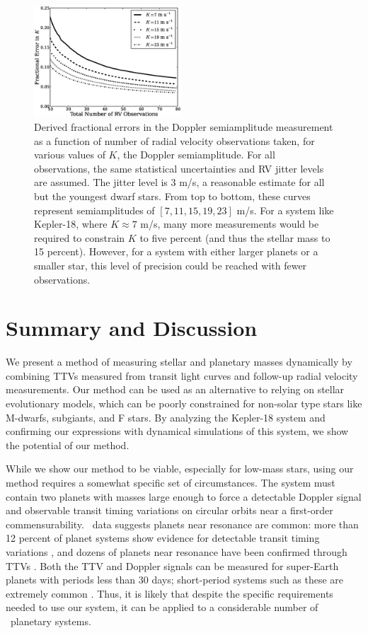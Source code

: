 \begin{figure}[htbp]
\centerline{\includegraphics[width=0.49\textwidth]{f1.eps}}
\caption{ Derived fractional errors in the Doppler semiamplitude measurement as a function of number of radial velocity observations taken, for various values of $K$, the Doppler semiamplitude. For all observations, the same statistical uncertainties and RV jitter levels are assumed. The jitter level is 3 m/s, a reasonable estimate for all but the youngest dwarf stars. From top to bottom, these curves represent semiamplitudes of $[7, 11, 15, 19, 23]$ m/s. For a system like Kepler-18, where $K \approx 7$ m/s, many more measurements would be required to constrain $K$ to five percent (and thus the stellar mass to 15 percent). However, for a system with either larger planets or a smaller star, this level of precision could be reached with fewer observations.
  }

\label{RVerrors}
\end{figure}



\section{Summary and Discussion}

\label{S:SD}

We present a  method of measuring stellar and planetary masses dynamically by combining TTVs measured from transit light curves and follow-up radial velocity measurements. Our method can be used as an alternative to relying on stellar evolutionary models, which can be poorly constrained for non-solar type stars like M-dwarfs, subgiants, and F stars. By analyzing the Kepler-18 system and confirming our expressions with dynamical simulations of this system, we show the potential of our method.

While we show our method to be viable, especially for low-mass stars, using our method requires a somewhat specific set of circumstances. The system must contain two planets with masses large enough to force a detectable Doppler signal and observable transit timing variations on circular orbits near a first-order commensurability. \kep\ data suggests planets near resonance are common: more than 12 percent of planet systems show evidence for detectable transit timing variations \citep{Ford12a}, and dozens of planets near resonance have been confirmed through TTVs \citep{Steffen12b}. Both the TTV and Doppler signals can be measured for super-Earth planets with periods less than 30 days; short-period systems such as these are extremely common \citep{Howard12}. Thus, it is likely that despite the specific requirements needed to use our system, it can be applied to a considerable number of \kep\ planetary systems.

